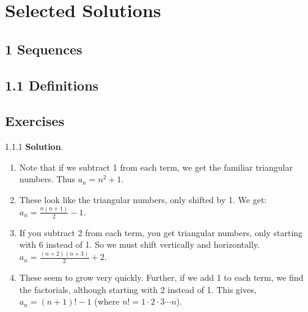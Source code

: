 \documentclass[11pt,]{book}
\theoremstyle{ptxplainnotitle}
\theoremstyle{ptxplaintitle}
\theoremstyle{ptxdefinitionnotitle}
\theoremstyle{ptxdefinitiontitle}
\theoremstyle{ptxdefinitionnotitle}
\theoremstyle{ptxdefinitiontitle}
\theoremstyle{ptxdefinitionnotitle}
\theoremstyle{ptxdefinitiontitle}
\theoremstyle{ptxdefinitiontitlenonumber}
\theoremstyle{ptxdefinitiontitlenonumber}
\numberwithin{equation}{chapter}
\begin{document}
\chapter[{Selected Solutions}]{Selected Solutions}\label{solutions-1}
\section*{1 Sequences}
\section*{1.1 Definitions}
\section*{Exercises}
\begin{divisionexercise}{1.1.1}
\textbf{Solution}.\quad%
\hypertarget{p-90}{}%
\leavevmode%
\begin{enumerate}[label=\alph*.]
\item\hypertarget{li-62}{}\hypertarget{p-91}{}%
Note that if we subtract 1 from each term, we get the familiar triangular numbers.  Thus \(a_n = n^2 + 1\text{.}\)%
\item\hypertarget{li-63}{}\hypertarget{p-92}{}%
These look like the triangular numbers, only shifted by 1.  We get: \(a_n = \frac{n(n+1)}{2} - 1\text{.}\)%
\item\hypertarget{li-64}{}\hypertarget{p-93}{}%
If you subtract 2 from each term, you get triangular numbers, only starting with 6 instead of 1.  So we must shift vertically and horizontally.  \(a_n = \frac{(n+2)(n+3)}{2} + 2\text{.}\)%
\item\hypertarget{li-65}{}\hypertarget{p-94}{}%
These seem to grow very quickly.  Further, if we add 1 to each term, we find the factorials, although starting with 2 instead of 1.  This gives, \(a_n = (n+1)! - 1\) (where \(n! = 1 \cdot 2 \cdot 3 \cdots n\)).%
\end{enumerate}
%
\end{divisionexercise}%
\end{document}
